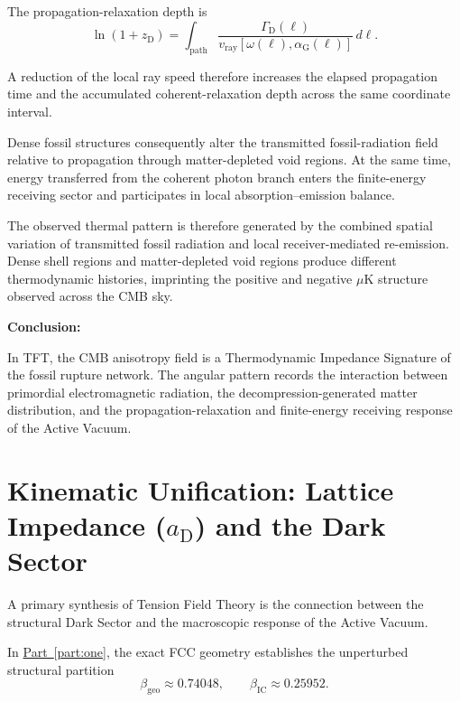 The propagation-relaxation depth is
\begin{equation}
    \ln(1+z_{\mathrm D})
    =
    \int_{\mathrm{path}}
    \frac{
        \Gamma_{\mathrm D}(\ell)
    }{
        v_{\mathrm{ray}}
        \left[
            \omega(\ell),
            \alpha_{\mathrm G}(\ell)
        \right]
    }
    \,d\ell.
\end{equation}

A reduction of the local ray speed therefore increases the elapsed propagation time and the accumulated coherent-relaxation depth across the same coordinate interval.

Dense fossil structures consequently alter the transmitted fossil-radiation field relative to propagation through matter-depleted void regions. At the same time, energy transferred from the coherent photon branch enters the finite-energy receiving sector and participates in local absorption--emission balance.

The observed thermal pattern is therefore generated by the combined spatial variation of transmitted fossil radiation and local receiver-mediated re-emission. Dense shell regions and matter-depleted void regions produce different thermodynamic histories, imprinting the positive and negative $\mu$K structure observed across the CMB sky.

\vspace{0.5em}

\noindent\textbf{Conclusion:}

In TFT, the CMB anisotropy field is a Thermodynamic Impedance Signature of the fossil rupture network. The angular pattern records the interaction between primordial electromagnetic radiation, the decompression-generated matter distribution, and the propagation-relaxation and finite-energy receiving response of the Active Vacuum.

\section{Kinematic Unification: Lattice Impedance ($a_{\mathrm D}$) and the Dark Sector}

A primary synthesis of Tension Field Theory is the connection between the structural Dark Sector and the macroscopic response of the Active Vacuum.

In \hyperref[part:one]{Part~\ref{part:one}}, the exact FCC geometry establishes the unperturbed structural partition
\begin{equation}
    \beta_{\mathrm{geo}}
    \approx
    0.74048,
    \qquad
    \beta_{\mathrm{IC}}
    \approx
    0.25952.
\end{equation}

